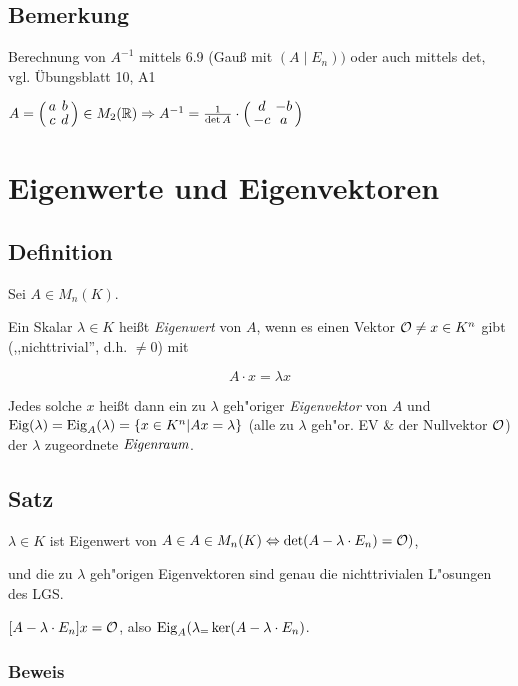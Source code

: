 \subsection{Bemerkung}

Berechnung von $A^{-1}$ mittels 6.9 (Gauß mit $(A\;|\;E_n))$ oder auch mittels det, vgl. Übungsblatt 10, A1

$A = \aMatrix{cc}{a & b \\ c & d} \in M_2(\R) \Rightarrow A^{-1} = \frac{1}{\det A} \cdot \aMatrix{cc}{d & - b \\ - c & a}$



\section{Eigenwerte und Eigenvektoren}

\subsection[Definition (Eigenwert)]{Definition}

Sei $A \in M_n(K)$.

Ein Skalar $\lambda \in K$ heißt \emph{Eigenwert} von $A$, wenn es einen Vektor $\mathcal{O} \neq x \in K^n$ gibt (,,nichttrivial'', d.h. $\neq 0$) mit

\[A\cdot x = \lambda x\]

Jedes solche $x$ heißt dann ein zu $\lambda$ geh"origer \emph{Eigenvektor} von $A$ und $\mathrm{ Eig }(\lambda)=\mathrm{ Eig }_A(\lambda)=\{x \in K^n | Ax=\lambda\}$ (alle zu $\lambda$ geh"or. EV \& der Nullvektor $\mathcal{O}$) der $\lambda$ zugeordnete $\emph{Eigenraum}$.

\subsection{Satz}

$\lambda \in K$ ist Eigenwert von $A \in A \in M_n(K) \Leftrightarrow \det(A-\lambda \cdot E_n) = \mathcal{O})$,

und die zu $\lambda$ geh"origen Eigenvektoren sind genau die nichttrivialen L"osungen des LGS.

$[A - \lambda \cdot E_n] x = \mathcal{O}$, also $\mathrm{ Eig }_A(\lambda_ = \ker(A- \lambda \cdot E_n)$.

\subsubsection*{Beweis}

